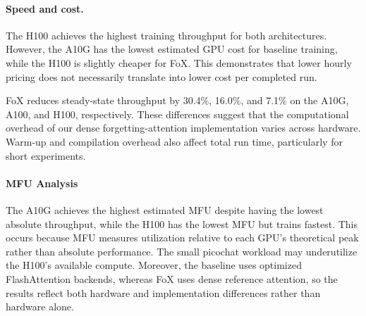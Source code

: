 \documentclass[11pt]{article}
\begin{document}
\paragraph{Speed and cost.}
The H100 achieves the highest training throughput for
both architectures. However, the A10G has the lowest
estimated GPU cost for baseline training, while the H100
is slightly cheaper for FoX. This demonstrates that lower
hourly pricing does not necessarily translate into lower
cost per completed run.

FoX reduces steady-state throughput by 30.4\%, 16.0\%,
and 7.1\% on the A10G, A100, and H100, respectively.
These differences suggest that the computational overhead
of our dense forgetting-attention implementation varies
across hardware. Warm-up and compilation overhead also
affect total run time, particularly for short experiments.


\paragraph{MFU Analysis}

The A10G achieves the highest estimated MFU despite
having the lowest absolute throughput, while the H100
has the lowest MFU but trains fastest. This occurs because
MFU measures utilization relative to each GPU's theoretical
peak rather than absolute performance. The small picochat
workload may underutilize the H100's available compute.
Moreover, the baseline uses optimized FlashAttention
backends, whereas FoX uses dense reference attention,
so the results reflect both hardware and implementation
differences rather than hardware alone.
\end{document}

